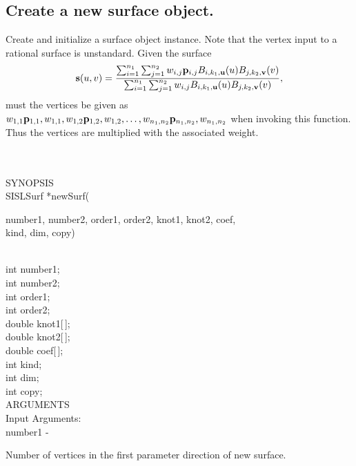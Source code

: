 \subsection{Create a new surface object.}\label{sec:newSurf}
\begin{minipg1}
Create and initialize a surface object instance. Note that the vertex input to a
  rational surface is unstandard. Given the surface
  $$
{\bf s}(u,v) = {\sum_{i=1}^{n_1}\sum_{j=1}^{n_2} w_{i,j} {\bf p}_{i,j} 
	    B_{i,k_1,{\bf u}}(u) B_{j,k_2,{\bf v}}(v)  \over
             \sum_{i=1}^{n_1}\sum_{j=1}^{n_2} w_{i,j}
	         B_{i,k_1,{\bf u}}(u) B_{j,k_2,{\bf v}}(v)},
$$
must the vertices be given as
${w_{1,1}  {\bf p}_{1,1}, w_{1,1}, w_{1,2}  {\bf p}_{1,2}, w_{1,2},  \ldots,
  w_{n_1,n_2}  {\bf p}_{n_1,n_2}, w_{n_1,n_2}}$ when invoking this function. Thus the vertices are multiplied with the
associated weight.
\end{minipg1} \\ \\
SYNOPSIS\\
        \>SISLSurf *newSurf(\begin{minipg3}
        {\fov number}1, {\fov number}2, {\fov order}1, {\fov order}2, {\fov knot}1, {\fov knot}2, {\fov coef},\\ {\fov kind}, {\fov dim}, {\fov copy})
                \end{minipg3}\\[0.3ex]
                \>\>    int    \>       {\fov number}1;\\
                \>\>    int    \>       {\fov number}2;\\
                \>\>    int    \>       {\fov order}1;\\
                \>\>    int    \>       {\fov order}2;\\
                \>\>    double \>       {\fov knot1}[\,];\\
                \>\>    double \>       {\fov knot2}[\,];\\
                \>\>    double \>       {\fov coef}[\,];\\
                \>\>    int    \>       {\fov kind};\\
                \>\>    int    \>       {\fov dim};\\
                \>\>    int    \>       {\fov copy};\\
ARGUMENTS\\
        \>Input Arguments:\\
        \>\>    {\fov number}1  \> - \> \begin{minipg2}
                        Number of vertices in the first parameter direction
                        of new surface.
                                \end{minipg2}\\[0.8ex]

